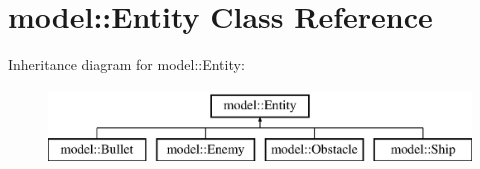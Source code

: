 \hypertarget{classmodel_1_1_entity}{}\section{model\+:\+:Entity Class Reference}
\label{classmodel_1_1_entity}
Inheritance diagram for model\+:\+:Entity\+:\begin{figure}[H]
\begin{center}
\leavevmode
\includegraphics[height=2.000000cm]{db/d33/classmodel_1_1_entity}
\end{center}
\end{figure}
